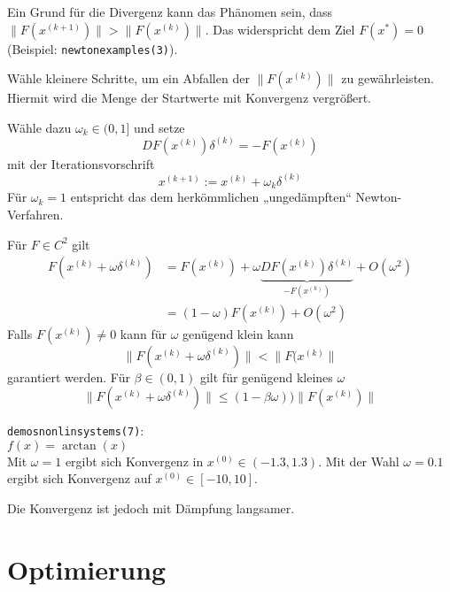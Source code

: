 \documentclass[11pt]{scrbook}
\begin{document}
Ein Grund für die Divergenz kann das Phänomen sein, dass $\|F(x^{(k+1)})\| > \|F(x^{(k)})\|$.
Das widerspricht dem Ziel $F(x^*) = 0$ (Beispiel: \texttt{newton\textunderscore examples(3)}).

\begin{seg}
	Wähle kleinere Schritte, um ein Abfallen der $\|F(x^{(k)})\|$ zu gewährleisten. 
	Hiermit wird die Menge der Startwerte mit Konvergenz vergrößert.

	Wähle dazu $\omega_k \in (0,1]$ und setze
	\[
		DF(x^{(k)}) \delta^{(k)} = - F(x^{(k)})
	\]
	mit der Iterationsvorschrift
	\[
		x^{(k+1)} := x^{(k)} + \omega_k \delta^{(k)}
	\]
	Für $\omega_k = 1$ entspricht das dem herkömmlichen „ungedämpften“ Newton-Verfahren.

	Für $F \in C^2$ gilt
	\begin{align*}
		F(x^{(k)} + \omega \delta^{(k)}) &= F(x^{(k)}) + \omega \underbrace{DF(x^{(k)})\delta^{(k)}}_{-F(x^{(k)})} + O(\omega^2) \\
		&= (1 - \omega)F(x^{(k)}) + O(\omega^2)
	\end{align*}
	Falls $F(x^{(k)}) \neq 0$ kann für $\omega$ genügend klein kann
	\[
		\|F(x^{(k)} + \omega \delta^{(k)}) \| < \|F(x^{(k)}\|
	\]
	garantiert werden.
	Für $\beta \in (0,1)$ gilt für genügend kleines $\omega$
	\[
		\|F(x^{(k)} + \omega \delta^{(k)})\|  \le (1 - \beta\omega)) \|F(x^{(k)})\|
	\]
	\begin{ex*}
		\texttt{demos\textunderscore nonlin\textunderscore systems(7)}: \\
		$f(x) = \arctan(x)$  \\
		Mit $\omega = 1$ ergibt sich Konvergenz in $x^{(0)} \in (-1.3, 1.3)$.
		Mit der Wahl $\omega = 0.1$ ergibt sich Konvergenz auf $x^{(0)} \in [-10, 10]$.

		Die Konvergenz ist jedoch mit Dämpfung langsamer.
	\end{ex*}
\end{seg}



\chapter{Optimierung}
\end{document}
